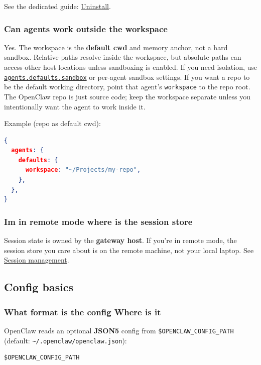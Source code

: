 See the dedicated guide: \href{/install/uninstall}{Uninstall}.

\subsubsection{Can agents work outside the workspace}


Yes. The workspace is the \textbf{default cwd} and memory anchor, not a hard sandbox.
Relative paths resolve inside the workspace, but absolute paths can access other
host locations unless sandboxing is enabled. If you need isolation, use
\href{/gateway/sandboxing}{\texttt{agents.defaults.sandbox}} or per-agent sandbox settings. If you
want a repo to be the default working directory, point that agent's
\texttt{workspace} to the repo root. The OpenClaw repo is just source code; keep the
workspace separate unless you intentionally want the agent to work inside it.

Example (repo as default cwd):

\begin{lstlisting}[language=json]
{
  agents: {
    defaults: {
      workspace: "~/Projects/my-repo",
    },
  },
}
\end{lstlisting}


\subsubsection{Im in remote mode where is the session store}


Session state is owned by the \textbf{gateway host}. If you're in remote mode, the session store you care about is on the remote machine, not your local laptop. See \href{/concepts/session}{Session management}.

\subsection{Config basics}


\subsubsection{What format is the config Where is it}


OpenClaw reads an optional \textbf{JSON5} config from \texttt{\$OPENCLAW\_CONFIG\_PATH} (default: \texttt{\textasciitilde{}/.openclaw/openclaw.json}):

\begin{lstlisting}
$OPENCLAW_CONFIG_PATH
\end{lstlisting}


